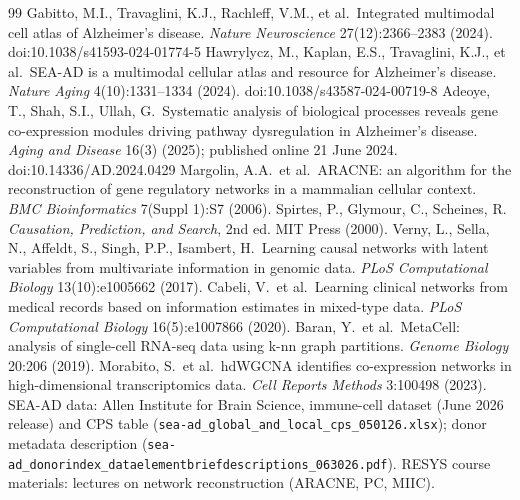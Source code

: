 \begin{thebibliography}{99}\small
{} Gabitto, M.I., Travaglini, K.J., Rachleff, V.M., et al.\ Integrated multimodal cell atlas of Alzheimer's disease. \emph{Nature Neuroscience} 27(12):2366--2383 (2024). doi:10.1038/s41593-024-01774-5
 Hawrylycz, M., Kaplan, E.S., Travaglini, K.J., et al.\ SEA-AD is a multimodal cellular atlas and resource for Alzheimer's disease. \emph{Nature Aging} 4(10):1331--1334 (2024). doi:10.1038/s43587-024-00719-8
 Adeoye, T., Shah, S.I., Ullah, G.\ Systematic analysis of biological processes reveals gene co-expression modules driving pathway dysregulation in Alzheimer's disease. \emph{Aging and Disease} 16(3) (2025); published online 21 June 2024. doi:10.14336/AD.2024.0429
 Margolin, A.A.\ et al.\ ARACNE: an algorithm for the reconstruction of gene regulatory networks in a mammalian cellular context. \emph{BMC Bioinformatics} 7(Suppl 1):S7 (2006).
 Spirtes, P., Glymour, C., Scheines, R. \emph{Causation, Prediction, and Search}, 2nd ed. MIT Press (2000).
 Verny, L., Sella, N., Affeldt, S., Singh, P.P., Isambert, H.\ Learning causal networks with latent variables from multivariate information in genomic data. \emph{PLoS Computational Biology} 13(10):e1005662 (2017).
 Cabeli, V.\ et al.\ Learning clinical networks from medical records based on information estimates in mixed-type data. \emph{PLoS Computational Biology} 16(5):e1007866 (2020).
 Baran, Y.\ et al.\ MetaCell: analysis of single-cell RNA-seq data using k-nn graph partitions. \emph{Genome Biology} 20:206 (2019).
 Morabito, S.\ et al.\ hdWGCNA identifies co-expression networks in high-dimensional transcriptomics data. \emph{Cell Reports Methods} 3:100498 (2023).
 SEA-AD data: Allen Institute for Brain Science, immune-cell dataset (June 2026 release) and CPS table (\texttt{sea-ad\_global\_and\_local\_cps\_050126.xlsx}); donor metadata description (\texttt{sea-ad\_donorindex\_dataelementbriefdescriptions\_063026.pdf}).
 RESYS course materials: lectures on network reconstruction (ARACNE, PC, MIIC).
\end{thebibliography}


